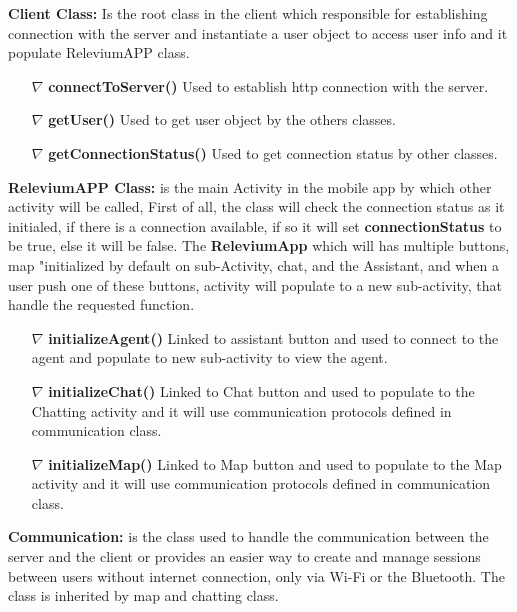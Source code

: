 \documentclass{scrreprt}
\begin{document}
\textbf{Client Class:} Is the root class in the client which responsible for establishing connection with the server and instantiate  a user object to access user info and it populate ReleviumAPP class.

\begin{itemize}

\item[$\nabla$] \textbf{connectToServer()} Used to establish http connection with the server.
\item[$\nabla$] \textbf{getUser()} Used to get user object by the others classes.
\item[$\nabla$] \textbf{getConnectionStatus()} Used to get connection status by other classes.
\end{itemize}

\textbf{ReleviumAPP Class:} is the main Activity in the mobile app by which other activity will be called,  First of all, the class will check the connection status as it initialed, if there is a connection available, if so it will set \textbf{connectionStatus} to be true, else it will be false. The \textbf{ReleviumApp} which will has multiple buttons, map "initialized by default on sub-Activity, chat, and the Assistant, and when a user push one of these buttons, activity will populate to a new sub-activity, that handle the requested function.

\begin{itemize}

\item[$\nabla$] \textbf{initializeAgent()} Linked to assistant button and used to connect to the agent and populate to new sub-activity to view the agent.
\item[$\nabla$] \textbf{initializeChat()} Linked to Chat button and used to populate to the Chatting activity and it will use communication protocols defined in communication class.
\item[$\nabla$] \textbf{initializeMap()} Linked to Map button and used to populate to the Map activity and it will use communication protocols defined in communication class.
\end{itemize}

\textbf{Communication:} is the class used to handle the communication between the server and the client or  provides an easier way to create and manage sessions between users without internet connection, only via Wi-Fi or the Bluetooth. The class is inherited by map and chatting class.
\end{document}
